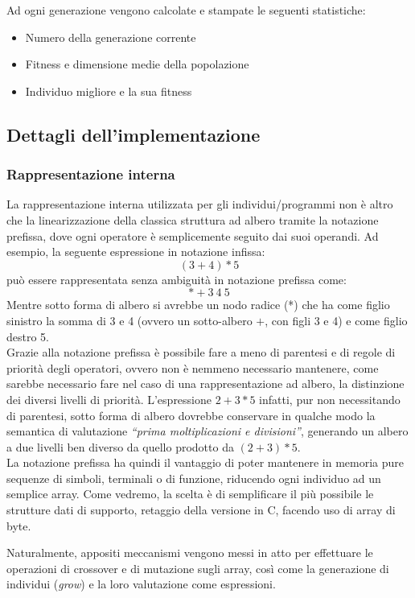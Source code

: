 \documentclass{../llncs}
\begin{document}
\noindent Ad ogni generazione vengono calcolate e stampate le seguenti statistiche:
\begin{itemize}
\setlength\itemsep{0.1em}
\item Numero della generazione corrente
\item Fitness e dimensione medie della popolazione
\item Individuo migliore e la sua fitness
\end{itemize}

\subsection{Dettagli dell'implementazione}
\subsubsection{Rappresentazione interna}
La rappresentazione interna utilizzata per gli individui/programmi non è altro che la linearizzazione della classica struttura ad albero tramite la notazione prefissa, dove ogni operatore è semplicemente seguito dai suoi operandi.
Ad esempio, la seguente espressione in notazione infissa:
\[
(3+4)*5
\]
può essere rappresentata senza ambiguità in notazione prefissa come:
\[
* + 3\:4\:5
\]
Mentre sotto forma di albero si avrebbe un nodo radice (*) che ha come figlio sinistro la somma di 3 e 4 (ovvero un sotto-albero $+$, con figli 3 e 4) e come figlio destro 5.\\

Grazie alla notazione prefissa è possibile fare a meno di parentesi e di regole di priorità degli operatori, ovvero non è nemmeno necessario mantenere, come sarebbe necessario fare nel caso di una rappresentazione ad albero, la distinzione dei diversi livelli di priorità. L'espressione $2+3*5$ infatti, pur non necessitando di parentesi, sotto forma di albero dovrebbe conservare in qualche modo la semantica di valutazione \textit{``prima moltiplicazioni e divisioni''}, generando un albero a due livelli ben diverso da quello prodotto da $(2+3)*5$.\\

La notazione prefissa ha quindi il vantaggio di poter mantenere in memoria pure sequenze di simboli, terminali o di funzione, riducendo ogni individuo ad un semplice array. Come vedremo, la scelta è di semplificare il più possibile le strutture dati di supporto, retaggio della versione in C, facendo uso di array di byte.

Naturalmente, appositi meccanismi vengono messi in atto per effettuare le operazioni di crossover e di mutazione sugli array, così come la generazione di individui (\emph{grow}) e la loro valutazione come espressioni.
\end{document}
